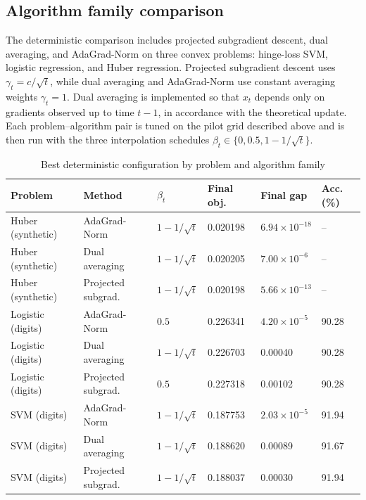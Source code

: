 \documentclass[11pt]{article}
\theoremstyle{definition}
\theoremstyle{remark}
\begin{document}
\subsection{Algorithm family comparison}
The deterministic comparison includes projected subgradient descent, dual averaging, and AdaGrad-Norm on three convex problems: hinge-loss SVM, logistic regression, and Huber regression. Projected subgradient descent uses $\gamma_t = c/\sqrt{t}$, while dual averaging and AdaGrad-Norm use constant averaging weights $\gamma_t = 1$. Dual averaging is implemented so that $x_t$ depends only on gradients observed up to time $t-1$, in accordance with the theoretical update. Each problem--algorithm pair is tuned on the pilot grid described above and is then run with the three interpolation schedules $\beta_t \in \{0,0.5,1-1/\sqrt{t}\}$.
\begin{table}[H]
    \centering
    \caption{Best deterministic configuration by problem and algorithm family}
    \label{tab:family}
    \small
    \begin{tabular}{llllll}
        \toprule
        Problem & Method & $\beta_t$ & Final obj. & Final gap & Acc. (\%) \\
        \midrule
        Huber (synthetic) & AdaGrad-Norm & $1-1/\sqrt{t}$ & 0.020198 & $6.94\times 10^{-18}$ & -- \\
        Huber (synthetic) & Dual averaging & $1-1/\sqrt{t}$ & 0.020205 & $7.00\times 10^{-6}$ & -- \\
        Huber (synthetic) & Projected subgrad. & $1-1/\sqrt{t}$ & 0.020198 & $5.66\times 10^{-13}$ & -- \\
        Logistic (digits) & AdaGrad-Norm & $0.5$ & 0.226341 & $4.20\times 10^{-5}$ & 90.28 \\
        Logistic (digits) & Dual averaging & $1-1/\sqrt{t}$ & 0.226703 & 0.00040 & 90.28 \\
        Logistic (digits) & Projected subgrad. & $0.5$ & 0.227318 & 0.00102 & 90.28 \\
        SVM (digits) & AdaGrad-Norm & $1-1/\sqrt{t}$ & 0.187753 & $2.03\times 10^{-5}$ & 91.94 \\
        SVM (digits) & Dual averaging & $1-1/\sqrt{t}$ & 0.188620 & 0.00089 & 91.67 \\
        SVM (digits) & Projected subgrad. & $1-1/\sqrt{t}$ & 0.188037 & 0.00030 & 91.94 \\
        \bottomrule
    \end{tabular}
\end{table}
\end{document}
